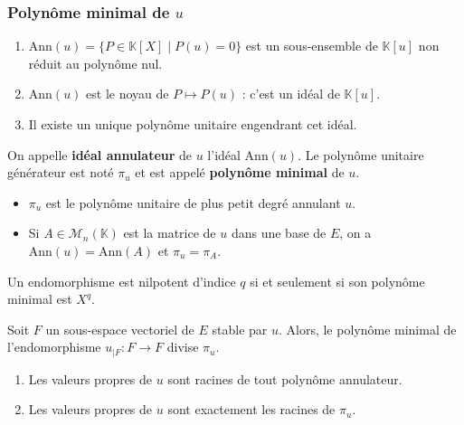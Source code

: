   \subsubsection{Polynôme minimal de \texorpdfstring{$u$}{u}}


  \begin{lemma}
    \begin{enumerate}[label=(\roman*)]
      \item $\mathrm{Ann}(u) = \{ P \in \mathbb{K}[X] \mid P(u) = 0 \}$ est un sous-ensemble de $\mathbb{K}[u]$ non réduit au polynôme nul.
      \item $\mathrm{Ann}(u)$ est le noyau de $P \mapsto P(u)$ : c'est un idéal de $\mathbb{K}[u]$.
      \item Il existe un unique polynôme unitaire engendrant cet idéal.
    \end{enumerate}
  \end{lemma}

  \begin{definition}
    On appelle \textbf{idéal annulateur} de $u$ l'idéal $\mathrm{Ann}(u)$. Le polynôme unitaire générateur est noté $\pi_u$ et est appelé \textbf{polynôme minimal} de $u$.
  \end{definition}

  \begin{remark}
    \begin{itemize}
      \item $\pi_u$ est le polynôme unitaire de plus petit degré annulant $u$.
      \item Si $A \in \mathcal{M}_n(\mathbb{K})$ est la matrice de $u$ dans une base de $E$, on a $\mathrm{Ann}(u) = \mathrm{Ann}(A)$ et $\pi_u = \pi_A$.
    \end{itemize}
  \end{remark}

  \begin{example}
    Un endomorphisme est nilpotent d'indice $q$ si et seulement si son polynôme minimal est $X^q$.
  \end{example}

  \begin{proposition}
    Soit $F$ un sous-espace vectoriel de $E$ stable par $u$. Alors, le polynôme minimal de l'endomorphisme $u_{|F} : F \rightarrow F$ divise $\pi_u$.
  \end{proposition}

  \begin{proposition}
    \begin{enumerate}[label=(\roman*)]
      \item Les valeurs propres de $u$ sont racines de tout polynôme annulateur.
      \item Les valeurs propres de $u$ sont exactement les racines de $\pi_u$.
    \end{enumerate}
  \end{proposition}

